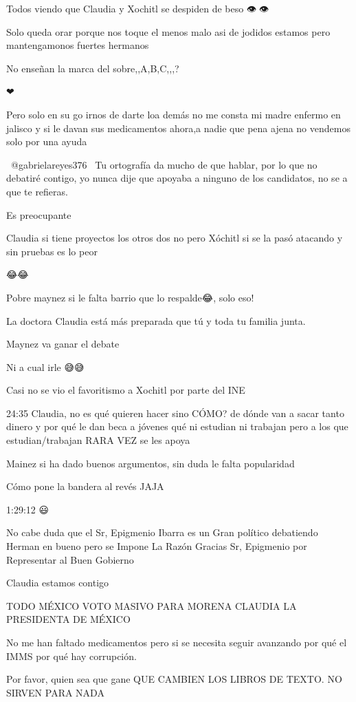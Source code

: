 Todos viendo que Claudia y Xochitl se despiden de beso 👁👄👁

Solo queda orar porque nos toque el menos malo asi de jodidos estamos pero mantengamonos fuertes hermanos

No enseñan la marca del sobre,,A,B,C,,,?

❤

Pero solo en su go irnos de darte loa demás no me consta mi madre enfermo en jalisco y si le davan  sus medicamentos  ahora,a nadie  que pena ajena no vendemos solo por una ayuda

 @gabrielareyes376  Tu ortografía da mucho de que hablar, por lo que no debatiré contigo, yo nunca dije que apoyaba a ninguno de los candidatos, no se a que te refieras.

Es preocupante

Claudia si tiene proyectos los otros dos no pero Xóchitl si se la pasó atacando y sin pruebas es lo peor

😂😂

Pobre maynez si le falta barrio que lo respalde😂, solo eso!

La doctora Claudia está más preparada que tú y toda tu familia junta.

Maynez va ganar el debate

Ni a cual irle 😅😅

Casi no se vio el favoritismo a Xochitl por parte del INE

24:35 Claudia, no es qué quieren hacer sino CÓMO? de dónde van a sacar tanto dinero y por qué le dan beca a jóvenes qué ni estudian ni trabajan pero a los que estudian/trabajan RARA VEZ se les apoya

Mainez si ha dado buenos argumentos, sin duda le falta popularidad

Cómo pone la bandera al revés JAJA

1:29:12 😃

No cabe duda que el Sr, Epigmenio Ibarra es un Gran político debatiendo Herman en bueno pero se Impone La Razón Gracias Sr, Epigmenio por Representar al Buen Gobierno

Claudia estamos contigo

TODO MÉXICO VOTO MASIVO PARA MORENA CLAUDIA LA PRESIDENTA DE MÉXICO

No me han faltado medicamentos pero si se necesita seguir avanzando por qué el IMMS por qué hay corrupción.

Por favor, quien sea que gane QUE CAMBIEN LOS LIBROS DE TEXTO. NO SIRVEN PARA NADA

